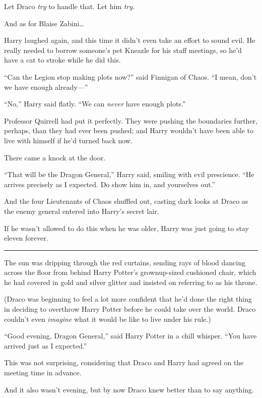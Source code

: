 Let Draco \emph{try} to handle that. Let him \emph{try}.

And as for Blaise Zabini\ldots{}

Harry laughed again, and this time it didn't even take an effort to
sound evil. He really needed to borrow someone's pet Kneazle for his
staff meetings, so he'd have a cat to stroke while he did this.

``Can the Legion stop making plots now?'' said Finnigan of Chaos. ``I
mean, don't we have enough already---''

``No,'' Harry said flatly. ``We can \emph{never} have enough plots.''

Professor Quirrell had put it perfectly. They were pushing the
boundaries further, perhaps, than they had ever been pushed; and Harry
wouldn't have been able to live with himself if he'd turned back now.

There came a knock at the door.

``That will be the Dragon General,'' Harry said, smiling with evil
prescience. ``He arrives precisely as I expected. Do show him in, and
yourselves out.''

And the four Lieutenants of Chaos shuffled out, casting dark looks at
Draco as the enemy general entered into Harry's secret lair.

If he wasn't allowed to do this when he was older, Harry was just going
to stay eleven forever.

\begin{center}\rule{3in}{0.4pt}\end{center}

The sun was dripping through the red curtains, sending rays of blood
dancing across the floor from behind Harry Potter's grownup-sized
cushioned chair, which he had covered in gold and silver glitter and
insisted on referring to as his throne.

(Draco was beginning to feel a lot more confident that he'd done the
right thing in deciding to overthrow Harry Potter before he could take
over the world. Draco couldn't even \emph{imagine} what it would be like
to live under his rule.)

``Good evening, Dragon General,'' said Harry Potter in a chill whisper.
``You have arrived just as I expected.''

This was not surprising, considering that Draco and Harry had agreed on
the meeting time in advance.

And it also wasn't evening, but by now Draco knew better than to say
anything.


